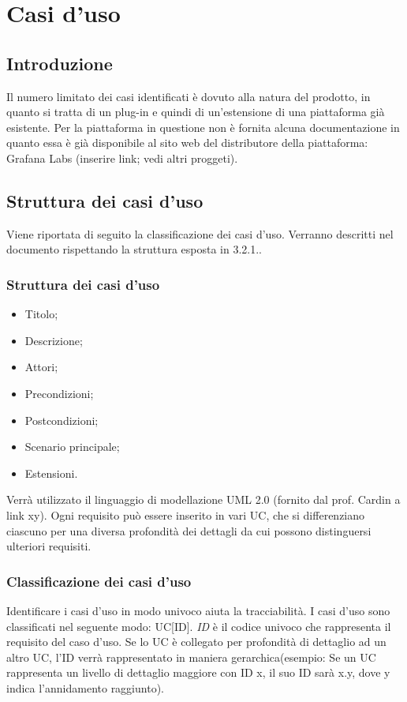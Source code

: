 \section{Casi d'uso}

	\subsection{Introduzione}
Il numero limitato dei casi identificati è dovuto alla natura del prodotto, in quanto si tratta di un plug-in e quindi di un’estensione di una piattaforma già esistente.
Per la piattaforma in questione non è fornita alcuna documentazione in quanto essa è già disponibile al sito web del distributore della piattaforma: Grafana Labs (inserire link; vedi altri proggeti).

	\subsection{Struttura dei casi d'uso}
Viene riportata di seguito la classificazione dei casi d’uso. Verranno descritti nel documento rispettando la struttura esposta in 3.2.1..
	
		\subsubsection{Struttura dei casi d'uso}
		\begin{itemize}
			\item Titolo;
 			\item Descrizione; 
 			\item Attori; 
			\item Precondizioni; 
 			\item Postcondizioni; 
 			\item Scenario principale; 
 			\item Estensioni.
 		\end{itemize}
Verrà utilizzato il linguaggio di modellazione UML 2.0 (fornito dal prof. Cardin a link xy).
Ogni requisito può essere inserito in vari UC, che si differenziano ciascuno per una diversa profondità dei dettagli da cui possono distinguersi ulteriori requisiti. 

		\subsubsection{Classificazione dei casi d'uso}
Identificare i casi d’uso in modo univoco aiuta la tracciabilità.  I casi d’uso sono classificati nel seguente modo:  UC[ID].
\emph{ID} è il codice univoco che rappresenta il requisito del caso d’uso. Se lo UC è collegato per profondità di dettaglio ad un altro UC, l’ID verrà rappresentato in maniera gerarchica(esempio: Se un UC rappresenta un livello di dettaglio maggiore con ID x, il suo ID sarà x.y, dove y indica l’annidamento raggiunto).
	
